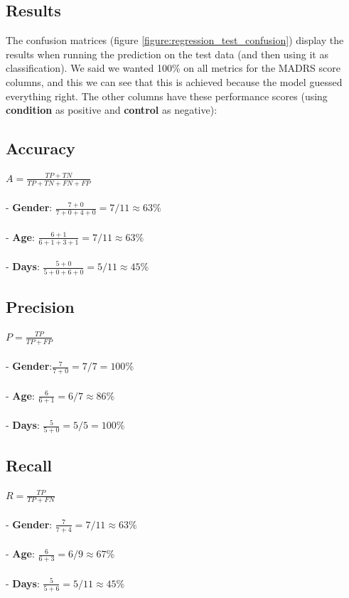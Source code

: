 \subsection{Results}

The confusion matrices (figure \ref{figure:regression_test_confusion}) display the results when running the prediction on the test data (and then using it as classification). We said we wanted 100\% on all metrics for the MADRS score columns, and this we can see that this is achieved because the model guessed everything right. The other columns have these performance scores (using \textbf{condition} as positive and \textbf{control} as negative):

\begin{multicols}{2}
\subsection{Accuracy}
$ A = \frac{TP+TN}{TP+TN+FN+FP} $
\\\\
- \textbf{Gender}: $\frac{7+0}{7+0+4+0} = 7/11 \approx 63\%$\\\\
- \textbf{Age}: $\frac{6+1}{6+1+3+1} = 7/11 \approx 63\%$\\\\
- \textbf{Days}: $\frac{5+0}{5+0+6+0} = 5/11 \approx 45\%$\\

\subsection{Precision}
$ P = \frac{TP}{TP+FP} $
\\\\
- \textbf{Gender}:$ \frac{7}{7+0} = 7/7 = 100\%$\\\\
- \textbf{Age}: $\frac{6}{6+1} = 6/7 \approx 86\%$\\\\
- \textbf{Days}: $\frac{5}{5+0} = 5/5 = 100\%$\\

\subsection{Recall}
$ R = \frac{TP}{TP+FN} $
\\\\
- \textbf{Gender}: $\frac{7}{7+4} = 7/11 \approx 63\%$\\\\
- \textbf{Age}: $\frac{6}{6+3} = 6/9 \approx 67\%$\\\\
- \textbf{Days}: $\frac{5}{5+6} = 5/11 \approx 45\%$


\end{multicols}
